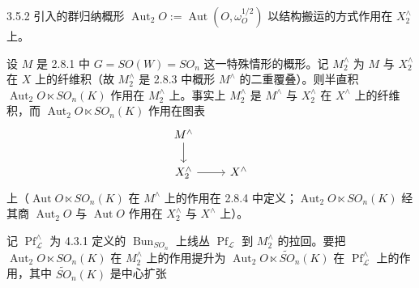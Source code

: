 3.5.2 引入的群归纳概形 $\operatorname{Aut}_{2}O:=\operatorname{Aut}(O,\omega_{O}^{1/2})$ 以结构搬运的方式作用在 $X_{2}^{\wedge}$ 上。

设 $M$ 是 2.8.1 中 $G=SO(W)=SO_{n}$ 这一特殊情形的概形。记 $M_{2}^{\wedge}$ 为 $M$ 与 $X_{2}^{\wedge}$ 在 $X$ 上的纤维积（故 $M_{2}^{\wedge}$ 是 2.8.3 中概形 $M^{\wedge}$ 的二重覆叠）。则半直积 $\operatorname{Aut}_{2}O\ltimes SO_{n}(K)$ 作用在 $M_{2}^{\wedge}$ 上。事实上 $M_{2}^{\wedge}$ 是 $M^{\wedge}$ 与 $X_{2}^{\wedge}$ 在 $X^{\wedge}$ 上的纤维积，而 $\operatorname{Aut}_{2}O\ltimes SO_{n}(K)$ 作用在图表
\[
\begin{tikzcd}
M^{\wedge} \arrow[d]\\
X_{2}^{\wedge} \arrow[r] & X^{\wedge}
\end{tikzcd}
\]
上（$\operatorname{Aut}O\ltimes SO_{n}(K)$ 在 $M^{\wedge}$ 上的作用在 2.8.4 中定义；$\operatorname{Aut}_{2}O\ltimes SO_{n}(K)$ 经其商 $\operatorname{Aut}_{2}O$ 与 $\operatorname{Aut}O$ 作用在 $X_{2}^{\wedge}$ 与 $X^{\wedge}$ 上）。

记 $\operatorname{Pf}_{\mathcal{L}}^{\wedge}$ 为 4.3.1 定义的 $\operatorname{Bun}_{SO_{n}}$ 上线丛 $\operatorname{Pf}_{\mathcal{L}}$ 到 $M_{2}^{\wedge}$ 的拉回。要把 $\operatorname{Aut}_{2}O\ltimes SO_{n}(K)$ 在 $M_{2}^{\wedge}$ 上的作用提升为 $\operatorname{Aut}_{2}O\ltimes\tilde{SO}_{n}(K)$ 在 $\operatorname{Pf}_{\mathcal{L}}^{\wedge}$ 上的作用，其中 $\tilde{SO}_{n}(K)$ 是中心扩张
